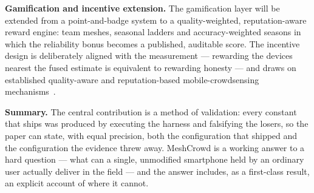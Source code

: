 \documentclass[journal,10pt]{IEEEtran}
\begin{document}
\textbf{Gamification and incentive extension.} The gamification layer will be
extended from a point-and-badge system to a quality-weighted, reputation-aware
reward engine: team meshes, seasonal ladders and accuracy-weighted seasons in
which the reliability bonus becomes a published, auditable score. The incentive
design is deliberately aligned with the measurement --- rewarding the devices
nearest the fused estimate is equivalent to rewarding honesty --- and draws on
established quality-aware and reputation-based mobile-crowdsensing
mechanisms~\cite{zhang2022,wang2018}.

\textbf{Summary.} The central contribution is a method of validation: every
constant that ships was produced by executing the harness and falsifying the
losers, so the paper can state, with equal precision, both the configuration
that shipped and the configuration the evidence threw away. MeshCrowd is a
working answer to a hard question --- what can a single, unmodified smartphone
held by an ordinary user actually deliver in the field --- and the answer
includes, as a first-class result, an explicit account of where it cannot.
\end{document}
